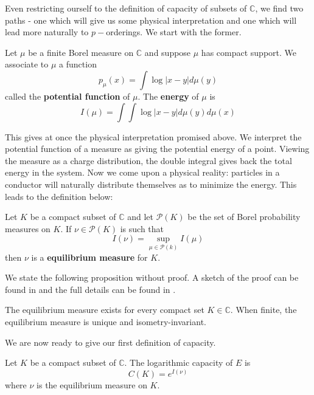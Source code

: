 Even restricting ourself to the definition of capacity of subsets of $\mathbb{C}$, we find two paths - one which will give us some physical interpretation and one which will lead more naturally to $p-$orderings. We start with the former.\\

\begin{definition} 
\cite{rand} Let $\mu$ be a finite Borel measure on $\mathbb{C}$ and suppose $\mu$ has compact support.  We associate to $\mu$ a function
\[p_\mu (x) =\int \log \lvert x - y \rvert d\mu(y)\] called the \textbf{potential function} of $\mu$. The \textbf{energy} of $\mu$ is 
\[I(\mu) =\int \int \log \lvert x - y \rvert d\mu(y) d\mu(x)\]
\end{definition}

This gives at once the physical interpretation promised above. We interpret the potential function of a measure as giving the potential energy of a point. Viewing the measure as a charge distribution, the double integral gives back the total energy in the system. Now we come upon a physical reality: particles in a conductor will naturally distribute themselves as to minimize the energy. This leads to the definition below:\\

\begin{definition}
\cite{rand} Let $K$ be a compact subset of $\mathbb{C}$ and let $\mathcal{P}(K)$ be the set of Borel probability measures on $K$. If $\nu \in \mathcal{P}(K)$ is such that 
\[I(\nu) = \sup_{\mu \in \mathcal{P}(k)} I(\mu)\] then $\nu$ is a \textbf{equilibrium measure} for $K$.
\end{definition}

We state the following proposition without proof. A sketch of the proof can be found in \cite{fp} and the full details can be found in \cite{rand}.\\

\begin{proposition}
\cite{rand} The equilibrium measure exists for every compact set $K \in \mathbb{C}$. When finite, the equilibrium measure is unique and isometry-invariant.
\end{proposition}

We are now ready to give our first definition of capacity.\\

\begin{definition}
\cite{rand} Let $K$ be a compact subset of $\mathbb{C}$. The logarithmic capacity of $E$ is 
\[C(K) = e^{I(\nu)}\] where $\nu$ is the equilibrium measure on $K$.
\end{definition}

